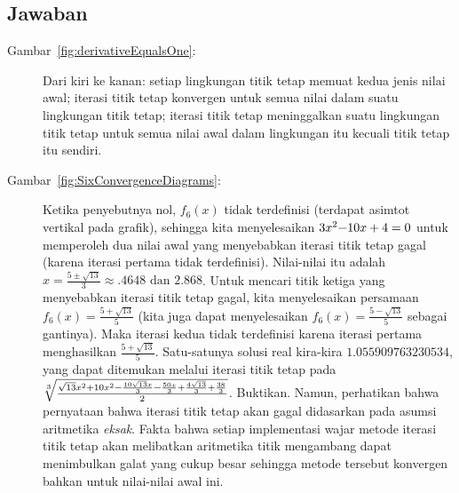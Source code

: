 \subsection*{Jawaban\label{subsec:Answers-fixedPointIteration}}
\begin{description}
\item [{Gambar~\ref{fig:derivativeEqualsOne}:}] Dari kiri ke kanan: setiap
lingkungan titik tetap memuat kedua jenis nilai awal; iterasi titik
tetap konvergen untuk semua nilai dalam suatu lingkungan titik tetap;
iterasi titik tetap meninggalkan suatu lingkungan titik tetap untuk
semua nilai awal dalam lingkungan itu kecuali titik tetap itu sendiri.
\item [{Gambar~\ref{fig:SixConvergenceDiagrams}:}] Ketika penyebutnya
nol, $f_{6}(x)$ tidak terdefinisi (terdapat asimtot vertikal pada
grafik), sehingga kita menyelesaikan $3x^{2}\text{\textminus}10x+4=0$
untuk memperoleh dua nilai awal yang menyebabkan iterasi titik tetap
gagal (karena iterasi pertama tidak terdefinisi). Nilai-nilai itu
adalah $x=\frac{5\pm\sqrt{13}}{3}\approx.4648\mbox{ dan }2.868$.
Untuk mencari titik ketiga yang menyebabkan iterasi titik tetap gagal,
kita menyelesaikan persamaan $f_{6}(x)=\frac{5+\sqrt{13}}{5}$ (kita
juga dapat menyelesaikan $f_{6}(x)=\frac{5-\sqrt{13}}{5}$ sebagai
gantinya). Maka iterasi kedua tidak terdefinisi karena iterasi pertama
menghasilkan $\frac{5+\sqrt{13}}{5}$. Satu-satunya solusi real kira-kira
$1.055909763230534$, yang dapat ditemukan melalui iterasi titik tetap
pada $\sqrt[3]{\frac{\sqrt{13}x^{2}+10x^{2}\text{\textminus}\frac{10\sqrt{13}x}{3}\text{\textminus}\frac{50x}{3}+\frac{4\sqrt{13}}{3}+\frac{38}{3}}{2}}$.
Buktikan. Namun, perhatikan bahwa pernyataan bahwa iterasi titik tetap
akan gagal didasarkan pada asumsi aritmetika \textit{eksak}. Fakta
bahwa setiap implementasi wajar metode iterasi titik tetap akan melibatkan
aritmetika titik mengambang dapat menimbulkan galat yang cukup besar
sehingga metode tersebut konvergen bahkan untuk nilai-nilai awal ini.
\end{description}

